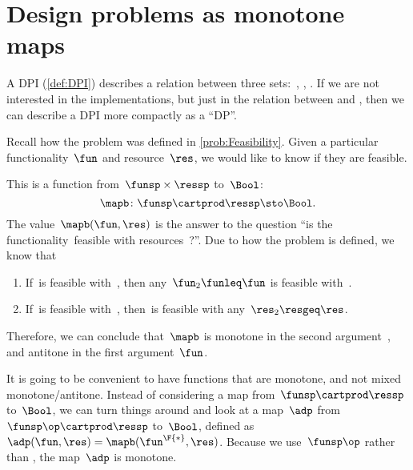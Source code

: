 
\section[DPs as monotone maps]{Design problems as monotone maps}
\label{sec:dpdefinition}


A DPI (\cref{def:DPI}) describes a relation between three sets:~\funsp, \ressp, \impsp.
If we are not interested in the implementations, but just in the relation between \funsp and \ressp, then we can describe a DPI more compactly as a ``DP''\@.

Recall how the problem \Feasibility was defined in \cref{prob:Feasibility}.
Given a particular functionality~$\fun$ and resource~$\res$, we would like to know if they are feasible.

This is a function from~$\funsp \times \ressp$ to~$\Bool$:
%
\begin{equation}
    \mapb\colon \funsp \cartprod \ressp \sto \Bool.
\end{equation}
%
The value~$\mapb(\fun, \res)$ is the answer to the question ``is the functionality~\fun feasible with resources~\res?''.
Due to how the problem is defined, we know that%
\begin{enumerate}
    \item If~\fun is feasible with~\res, then any~$\fun_2 \funleq \fun$ is feasible with~\res.
    \item If~\fun is feasible with~\res, then~\fun is feasible with any~$\res_2 \resgeq \res$.
\end{enumerate}
Therefore, we can conclude that~$\mapb$ is monotone in the second argument~\res, and antitone in the first argument~$\fun$.

It is going to be convenient to have functions that are monotone, and not mixed monotone/antitone.
Instead of considering a map from~$\funsp \cartprod \ressp$ to~$\Bool$, we can turn things around and look at a map~$\adp$ from~$\funsp\op \cartprod \ressp$ to~$\Bool$, defined as~$\adp(\fun,\res) = \mapb(\fun^\F{*},\res)$.
Because we use~$\funsp\op$ rather than \funsp, the map~$\adp$ is monotone.


